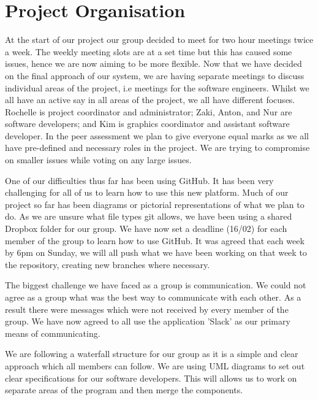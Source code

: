 \documentclass[11pt]{article}
\begin{document}
	\section{Project Organisation}
		At the start of our project our group decided to meet for two hour meetings twice a week. 
		The weekly meeting slots are at a set time but this has caused some issues, hence we are now aiming to be more flexible. 
		Now that we have decided on the final approach of our system, we are having separate meetings to discuss individual areas of the project, i.e meetings for the software engineers. 
		Whilst we all have an active say in all areas of the project, we all have different focuses. Rochelle is project coordinator and administrator; Zaki, Anton, and Nur are software developers; and Kim is graphics coordinator and assistant software developer. 
		In the peer assessment we plan to give everyone equal marks as we all have pre-defined and necessary roles in the project. 
		We are trying to compromise on smaller issues while voting on any large issues. 
		 
		One of our difficulties thus far has been using GitHub. 
		It has been very challenging for all of us to learn how to use this new platform.  
		Much of our project so far has been diagrams or pictorial representations of what we plan to do. 
		As we are unsure what file types git allows, we have been using a shared Dropbox folder for our group. 
		We have now set a deadline (16/02) for each member of the group to learn how to use GitHub. 
		It was agreed that each week by 6pm on Sunday, we will all push what we have been working on that week to the repository, creating new branches where necessary. 
		
		The biggest challenge we have faced as a group is communication. 
		We could not agree as a group what was the best way to communicate with each other. 
		As a result there were messages which were not received by every member of the group. 
		We have now agreed to all use the application 'Slack' as our primary means of communicating. 
		
		We are following a waterfall structure for our group as it is a simple and clear approach which all members can follow. 
		We are using UML diagrams to set out clear specifications for our software developers. 
		This will allows us to work on separate areas of the program and then merge the components.  
	
\end{document}
